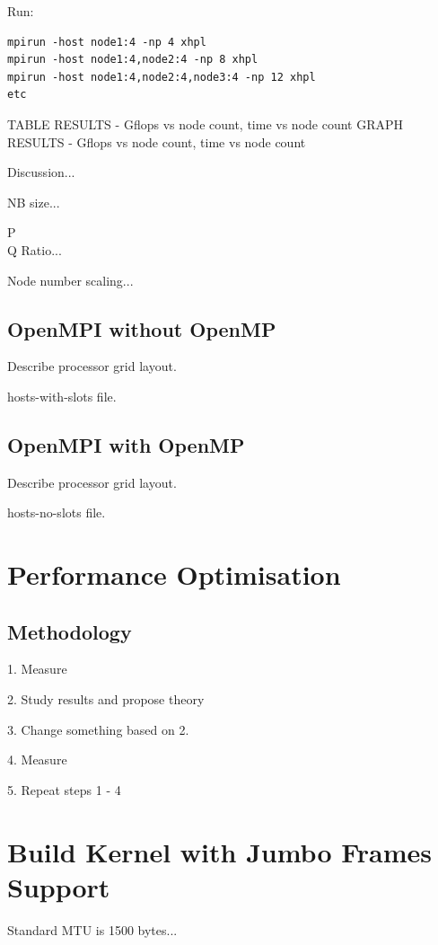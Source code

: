 \documentclass{article}
\begin{document}
Run:

\begin{verbatim}
mpirun -host node1:4 -np 4 xhpl
mpirun -host node1:4,node2:4 -np 8 xhpl
mpirun -host node1:4,node2:4,node3:4 -np 12 xhpl
etc
\end{verbatim}

TABLE RESULTS - Gflops vs node count, time vs node count
GRAPH RESULTS - Gflops vs node count, time vs node count

Discussion...

NB size...

P\\Q Ratio...

Node number scaling...


\subsection{OpenMPI without OpenMP}

Describe processor grid layout.

hosts-with-slots file.

\subsection{OpenMPI with OpenMP}

Describe processor grid layout.

hosts-no-slots file.

%
%
\section{Performance Optimisation}


\subsection{Methodology}
1. Measure

2. Study results and propose theory

3. Change something based on 2.

4. Measure

5. Repeat steps 1 - 4


%
%
\section{Build Kernel with Jumbo Frames Support}

Standard MTU is 1500 bytes...
\end{document}

